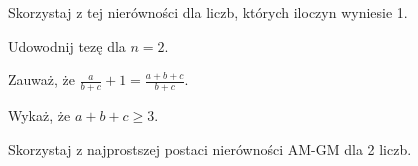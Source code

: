 
\begin{hints_list}
	\item Skorzystaj z tej nierówności dla liczb, których iloczyn wyniesie 1.
	\item Udowodnij tezę dla $n = 2$.
	\item Zauważ, że $\frac{a}{b + c} + 1 = \frac{a + b + c}{b + c}$.
	\item Wykaż, że $a + b + c \geqslant 3$.
	\item Skorzystaj z najprostszej postaci nierówności AM-GM dla 2 liczb.
\end{hints_list}